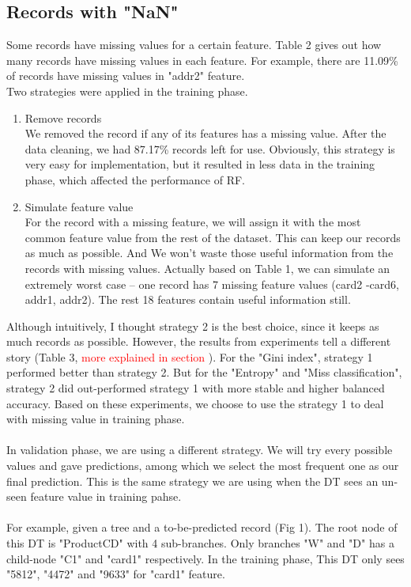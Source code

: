 \documentclass{article}
\begin{document}
\subsection{Records with "NaN"}
Some records have missing values for a certain feature. Table 2 gives out how many records have missing values in each feature. For example, there are 11.09\% of records have missing values in "addr2" feature.\\
Two strategies were applied in the training phase.
\begin{enumerate}
    \item Remove records
    \\We removed the record if any of its features has a missing value. After the data cleaning, we had 87.17\% records left for use. Obviously, this strategy is very easy for implementation, but it resulted in less data in the training phase, which affected the performance of RF.
    \item Simulate feature value
    \\For the record with a missing feature, we will assign it with the most common feature value from the rest of the dataset. This can keep our records as much as possible. And We won't waste those useful information from the records with missing values. Actually based on Table 1, we can simulate an extremely worst case -- one record has 7 missing feature values (card2 -card6, addr1, addr2). The rest 18 features contain useful information still.
\end{enumerate}
Although intuitively, I thought strategy 2 is the best choice, since it keeps as much records as possible. However, the results from experiments tell a different story (Table 3, \textcolor{red}{more explained in section} ). For the "Gini index", strategy 1 performed better than strategy 2. But for the "Entropy" and "Miss classification", strategy 2 did out-performed strategy 1 with more stable and higher balanced accuracy. Based on these experiments, we choose to use the strategy 1 to deal with missing value in training phase.\\\\
In validation phase, we are using a different strategy. We will try every possible values and gave predictions, among which we select the most frequent one as our final prediction. This is the same strategy we are using when the DT sees an un-seen feature value in training pahse.\\\\
For example, given a tree and a to-be-predicted record (Fig 1). The root node of this DT is "ProductCD" with 4 sub-branches. Only branches "W" and "D" has a child-node "C1" and "card1" respectively. In the training phase, This DT only sees "5812", "4472" and "9633" for "card1" feature.\\\\  
\end{document}
